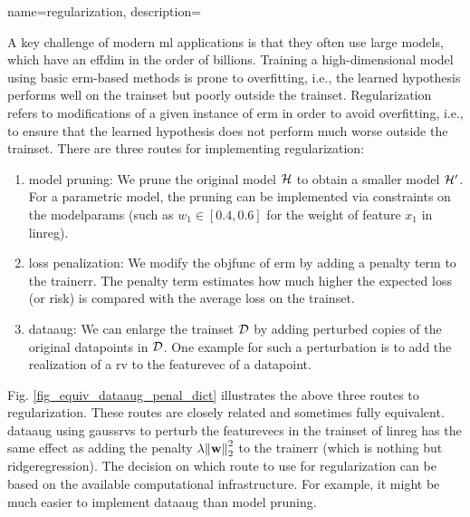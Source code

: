 {name={regularization}, 
	description={A key challenge of modern \gls{ml} applications is that they often 
		use large \glspl{model}, which have an \gls{effdim} in the order of billions. 
		Training a high-dimensional \gls{model} using basic \gls{erm}-based methods
		is prone to \gls{overfitting}, i.e., the learned \gls{hypothesis} performs well on the \gls{trainset} 
		but poorly outside the \gls{trainset}. Regularization refers to modifications of a given instance 
		of \gls{erm} in order to avoid \gls{overfitting}, i.e., to ensure that the learned \gls{hypothesis} does 
		not perform much worse outside the \gls{trainset}. There are three routes for implementing 
		regularization: 
		\begin{enumerate}[label=\arabic*)]
			\item {\Gls{model} pruning:} We prune the original \gls{model} $\mathcal{H}$ to obtain a 
			smaller \gls{model} $\mathcal{H}'$. For a parametric \gls{model}, the pruning can be 
			implemented via constraints on the \glspl{modelparam} (such as $w_{1} \in [0.4,0.6]$ for 
			the weight of \gls{feature} $x_{1}$ in \gls{linreg}).
			\item {\Gls{loss} penalization:} We modify the \gls{objfunc} of \gls{erm} by adding a 
			penalty term to the \gls{trainerr}. The penalty term estimates how much higher the expected \gls{loss} (or \gls{risk}) 
			is compared with the average \gls{loss} on the \gls{trainset}. 
			\item {\Gls{dataaug}:} We can enlarge the \gls{trainset} $\mathcal{D}$ by adding 
			perturbed copies of the original \glspl{datapoint} in $\mathcal{D}$. One example for such 
			a perturbation is to add the \gls{realization} of a \gls{rv} to the \gls{featurevec} 
			of a \gls{datapoint}. 
		\end{enumerate} 
		Fig. \ref{fig_equiv_dataaug_penal_dict} illustrates the above three routes to regularization. 
		These routes are closely related and sometimes fully equivalent. \Gls{dataaug} using \glspl{gaussrv} 
		to perturb the \glspl{featurevec} in the \gls{trainset} of \gls{linreg} 
		has the same effect as adding the penalty 
		$\lambda \normgeneric{\weights}{2}^2$ to the \gls{trainerr} (which is nothing but \gls{ridgeregression}). 
        		The decision on which route to use for regularization can be based on the 
        		available computational infrastructure. For example, it might be much easier to 
        		implement \gls{dataaug} than \gls{model} pruning. 
		\begin{figure}[H]

\end{figure}}}
